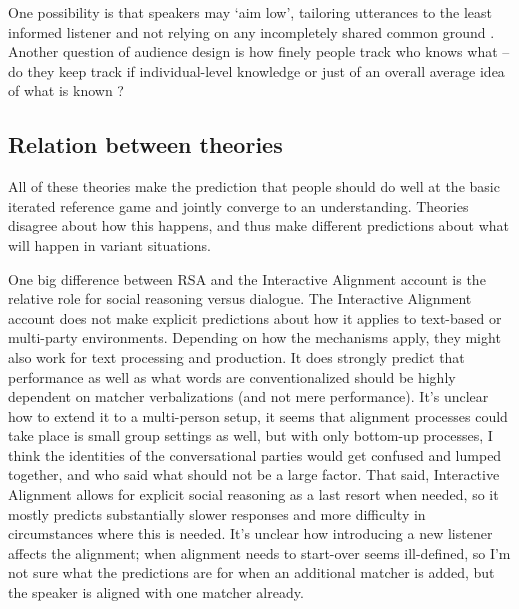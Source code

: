 \documentclass[11pt]{article}
\begin{document}
One possibility is that speakers may `aim low', tailoring utterances to the least informed listener and not relying on any incompletely shared common ground \cite{yoonAudienceDesignMultiparty2019}. Another question of audience design is how finely people track who knows what -- do they keep track if individual-level knowledge or just of an overall average idea of what is known \cite{yoonAudienceDesignMultiparty2019}? 

\subsection{Relation between theories}
All of these theories make the prediction that people should do well at the basic iterated reference game and jointly converge to an understanding. Theories disagree about how this happens, and thus make different predictions about what will happen in variant situations. 

One big difference between RSA and the Interactive Alignment account is the relative role for social reasoning versus dialogue. The Interactive Alignment account does not make explicit predictions about how it applies to text-based or multi-party environments. Depending on how the mechanisms apply, they might also work for text processing and production. It does strongly predict that performance as well as what words are conventionalized should be highly dependent on matcher verbalizations (and not mere performance). It's unclear how to extend it to a multi-person setup, it seems that alignment processes could take place is small group settings as well, but with only bottom-up processes, I think the identities of the conversational parties would get confused and lumped together, and who said what should not be a large factor. That said, Interactive Alignment allows for explicit social reasoning as a last resort when needed, so it mostly predicts substantially slower responses and more difficulty in circumstances where this is needed. It's unclear how introducing a new listener affects the alignment; when alignment needs to start-over seems ill-defined, so I'm not sure what the predictions are for when an additional matcher is added, but the speaker is aligned with one matcher already. 
\end{document}
